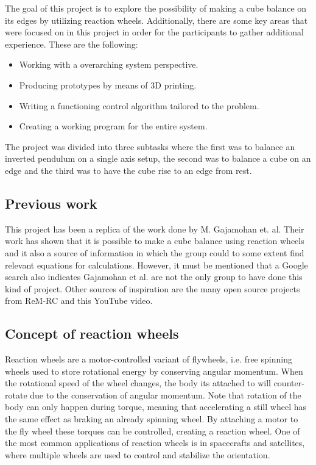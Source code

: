 The goal of this project is to explore the possibility of making a cube balance on its edges by utilizing reaction wheels. Additionally, there are some key areas that were focused on in this project in order for the participants to gather additional experience. These are the following:

\begin{itemize}
    \item Working with a overarching system perspective.
    \item Producing prototypes by means of 3D printing.
    \item Writing a functioning control algorithm tailored to the problem. 
    \item Creating a working program for the entire system.
\end{itemize}

\noindent
The project was divided into three subtasks where the first was to balance an inverted pendulum on a single axis setup, the second was to balance a cube on an edge and the third was to have the cube rise to an edge from rest.

\subsection{Previous work}
This project has been a replica of the work done by M. Gajamohan et. al\cite{cubli-planar}. Their work has shown that it is possible to make a cube balance using reaction wheels and it also a source of information in which the group could to some extent find relevant equations for calculations. However, it must be mentioned that a Google search also indicates Gajamohan et al. are not the only group to have done this kind of project. Other sources of inspiration are the many open source projects from ReM-RC\cite{remrc} and this YouTube video\cite{LEGO-video}.

\subsection{Concept of reaction wheels}
Reaction wheels are a motor-controlled variant of flywheels, i.e. free spinning wheels used to store rotational energy by conserving angular momentum. When the rotational speed of the wheel changes, the body its attached to will counter-rotate due to the conservation of angular momentum. Note that rotation of the body can only happen during torque, meaning that accelerating a still wheel has the same effect as braking an already spinning wheel. By attaching a motor to the fly wheel these torques can be controlled, creating a reaction wheel. One of the most common applications of reaction wheels is in spacecrafts and satellites, where multiple wheels are used to control and stabilize the orientation.